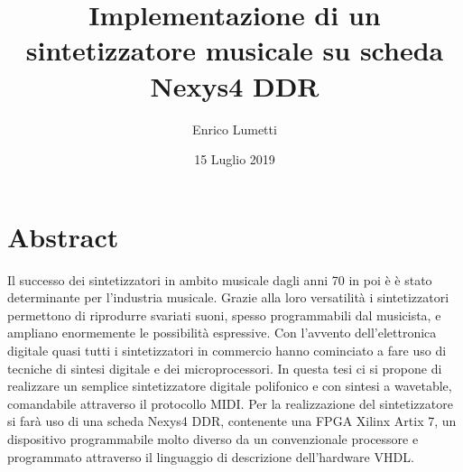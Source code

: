 \documentclass[italian,a4paper,12pt]{book}
\begin{document}
\author{Enrico Lumetti}
\title{Implementazione di un sintetizzatore musicale su scheda Nexys4 DDR}
\date{15 Luglio 2019}

\frontmatter
\maketitle

\chapter*{Abstract}
Il successo dei sintetizzatori in ambito musicale dagli anni 70 in poi è
è stato determinante per l'industria musicale. Grazie alla loro versatilità
i sintetizzatori permettono di riprodurre svariati suoni, spesso
programmabili dal musicista, e ampliano enormemente le possibilità espressive.
Con l'avvento dell'elettronica digitale quasi tutti i sintetizzatori in
commercio hanno cominciato a fare uso di tecniche di sintesi digitale e
dei microprocessori.
In questa tesi ci si propone di realizzare un semplice sintetizzatore 
digitale polifonico e con sintesi a wavetable, comandabile attraverso
il protocollo MIDI.
Per la realizzazione del sintetizzatore si farà uso di una scheda
Nexys4 DDR, contenente una FPGA Xilinx Artix 7, un dispositivo programmabile
molto diverso da un convenzionale processore e programmato attraverso
il linguaggio di descrizione dell'hardware VHDL.
\tableofcontents

\mainmatter








\backmatter
\end{document}
